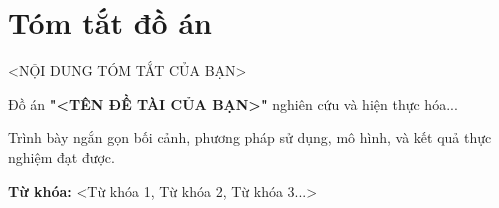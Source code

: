 
\chapter*{Tóm tắt đồ án}

<NỘI DUNG TÓM TẮT CỦA BẠN>

Đồ án \textbf{"<TÊN ĐỀ TÀI CỦA BẠN>"} nghiên cứu và hiện thực hóa...

Trình bày ngắn gọn bối cảnh, phương pháp sử dụng, mô hình, và kết quả thực nghiệm đạt được.

\textbf{Từ khóa:} <Từ khóa 1, Từ khóa 2, Từ khóa 3...>

